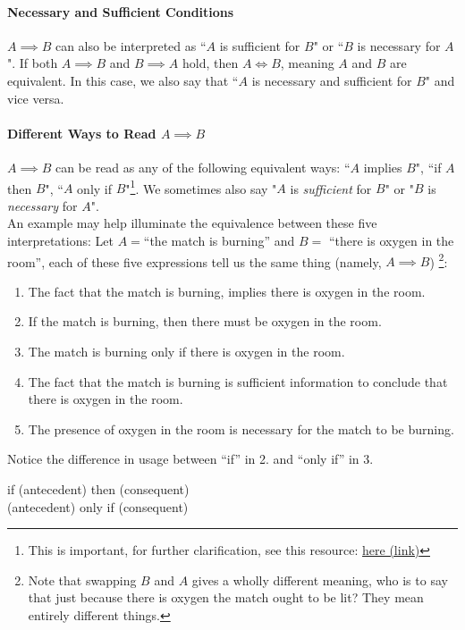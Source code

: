 \paragraph{Necessary and Sufficient Conditions}
$A \implies B$ can also be interpreted as ``$A$ is sufficient for $B$" or ``$B$ is necessary for $A$". If both $A \implies B$ and $B \implies A$ hold, then $A \iff B$, meaning $A$ and $B$ are equivalent. In this case, we also say that ``$A$ is necessary and sufficient for $B$" and vice versa.

\paragraph{Different Ways to Read $A \implies B$}
$A \implies B$ can be read as any of the following equivalent ways: ``$A$ implies $B$", ``if $A$ then $B$", ``$A$ only if $B$"\footnote{This is important, for further clarification, see this resource: \href{https://criticalthinkeracademy.com/courses/propositional-logic/lectures/51574}{here (link)}}. We sometimes also say "$A$ is \textit{sufficient} for $B$" or "$B$ is \textit{necessary} for $A$". \\

An example may help illuminate the equivalence between these five interpretations: Let $A=$``the match is burning'' and $B=$ ``there is oxygen in the room'', each of these five expressions tell us the same thing (namely, $A \implies B$) \footnote{Note that swapping $B$ and $A$ gives a wholly different meaning, who is to say that just because there is oxygen the match ought to be lit? They mean entirely different things.}:
\begin{enumerate}
    \item The fact that the match is burning, implies there is oxygen in the room.
    \item If the match is burning, then there must be oxygen in the room.
    \item The match is burning only if there is oxygen in the room.
    \item The fact that the match is burning is sufficient information to conclude that there is oxygen in the room.
    \item The presence of oxygen in the room is necessary for the match to be burning.
\end{enumerate}
Notice the difference in usage between ``if'' in 2. and ``only if'' in 3.
\begin{center}
    if (antecedent) then (consequent)  \\
(antecedent) only if (consequent) \\
\end{center}

